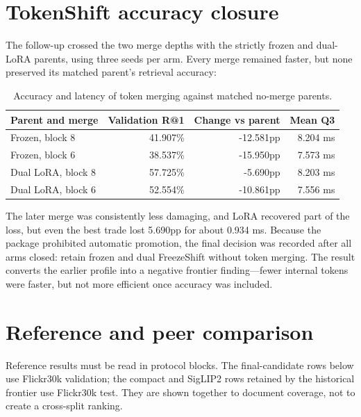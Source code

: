 \section{TokenShift accuracy closure}
The follow-up crossed the two merge depths with the strictly frozen \MTone{} and dual-LoRA parents, using three seeds per arm. Every merge remained faster, but none preserved its matched parent's retrieval accuracy:

\begin{table}[htbp]
\centering
\caption{Accuracy and latency of token merging against matched no-merge parents.}
\label{tab:tokenshift-accuracy}
\begin{tabular}{L{4.5cm}rrr}
\toprule
Parent and merge & Validation R@1 & Change vs parent & Mean Q3 \\
\midrule
Frozen, block 8 & 41.907\% & -12.581pp & 8.204 ms \\
Frozen, block 6 & 38.537\% & -15.950pp & 7.573 ms \\
Dual LoRA, block 8 & 57.725\% & -5.690pp & 8.203 ms \\
Dual LoRA, block 6 & 52.554\% & -10.861pp & 7.556 ms \\
\bottomrule
\end{tabular}
\end{table}
The later merge was consistently less damaging, and LoRA recovered part of the loss, but even the best trade lost 5.690pp for about 0.934 ms. Because the package prohibited automatic promotion, the final decision was recorded after all arms closed: retain frozen \MTone{} and dual FreezeShift without token merging. The result converts the earlier profile into a negative frontier finding---fewer internal tokens were faster, but not more efficient once accuracy was included.

\section{Reference and peer comparison}
Reference results must be read in protocol blocks. The final-candidate rows below use Flickr30k validation; the compact and SigLIP2 rows retained by the historical frontier use Flickr30k test. They are shown together to document coverage, not to create a cross-split ranking.

